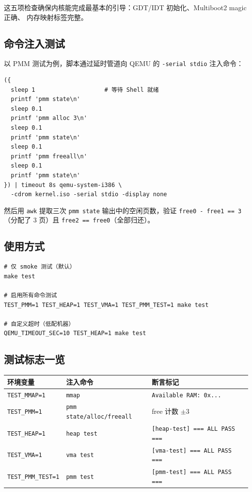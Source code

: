 这五项检查确保内核能完成最基本的引导：GDT/IDT 初始化、Multiboot2 magic 正确、
内存映射标签完整。

\subsection{命令注入测试}

以 PMM 测试为例，脚本通过延时管道向 QEMU 的 \texttt{-serial stdio} 注入命令：

\begin{lstlisting}[style=shellstyle]
({
  sleep 1                    # 等待 Shell 就绪
  printf 'pmm state\n'
  sleep 0.1
  printf 'pmm alloc 3\n'
  sleep 0.1
  printf 'pmm state\n'
  sleep 0.1
  printf 'pmm freeall\n'
  sleep 0.1
  printf 'pmm state\n'
}) | timeout 8s qemu-system-i386 \
  -cdrom kernel.iso -serial stdio -display none
\end{lstlisting}

然后用 \texttt{awk} 提取三次 \texttt{pmm state} 输出中的空闲页数，验证
\texttt{free0 - free1 == 3}（分配了 3 页）且 \texttt{free2 == free0}（全部归还）。

\subsection{使用方式}

\begin{lstlisting}[style=shellstyle, numbers=none]
# 仅 smoke 测试（默认）
make test

# 启用所有命令测试
TEST_PMM=1 TEST_HEAP=1 TEST_VMA=1 TEST_PMM_TEST=1 make test

# 自定义超时（低配机器）
QEMU_TIMEOUT_SEC=10 TEST_HEAP=1 make test
\end{lstlisting}

\subsection{测试标志一览}

\begin{longtable}{lll}
  \toprule
  \textbf{环境变量} & \textbf{注入命令} & \textbf{断言标记} \\
  \midrule
  \texttt{TEST\_MMAP=1}      & \texttt{mmap}      & \texttt{Available RAM: 0x...} \\
  \texttt{TEST\_PMM=1}       & \texttt{pmm state/alloc/freeall} & free 计数 $\pm 3$ \\
  \texttt{TEST\_HEAP=1}      & \texttt{heap test}  & \texttt{[heap-test] === ALL PASS ===} \\
  \texttt{TEST\_VMA=1}       & \texttt{vma test}   & \texttt{[vma-test] === ALL PASS ===} \\
  \texttt{TEST\_PMM\_TEST=1} & \texttt{pmm test}   & \texttt{[pmm-test] === ALL PASS ===} \\
  \bottomrule
\end{longtable}


